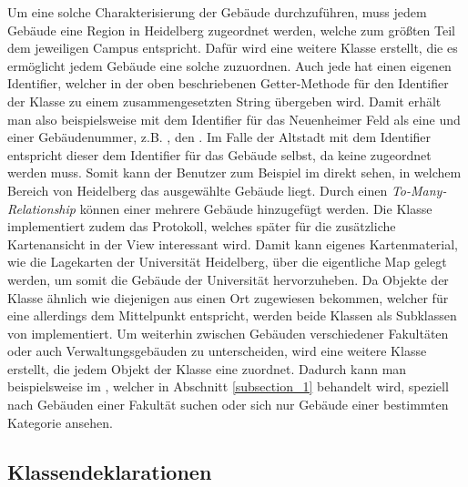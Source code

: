 \documentclass{report}
\begin{document}
\noindent Um eine solche Charakterisierung der Gebäude durchzuführen, muss jedem Gebäude eine Region in Heidelberg zugeordnet werden, welche zum größten Teil dem jeweiligen Campus entspricht. Dafür wird eine weitere Klasse  erstellt, die es ermöglicht jedem Gebäude eine solche  zuzuordnen. Auch jede  hat einen eigenen Identifier, welcher in der oben beschriebenen Getter-Methode für den Identifier der  Klasse zu einem zusammengesetzten String übergeben wird. Damit erhält man also beispielsweise mit dem Identifier  für das Neuenheimer Feld als eine  und einer Gebäudenummer, z.B. , den  . Im Falle der Altstadt mit dem Identifier  entspricht dieser dem Identifier für das Gebäude selbst, da keine  zugeordnet werden muss. Somit kann der Benutzer zum Beispiel im  direkt sehen, in welchem Bereich von Heidelberg das ausgewählte Gebäude liegt. Durch einen \emph{To-Many-Relationship}  können einer  mehrere Gebäude hinzugefügt werden. Die Klasse  implementiert zudem das  Protokoll, welches später für die zusätzliche Kartenansicht in der View interessant wird. Damit kann eigenes Kartenmaterial, wie die Lagekarten der Universität Heidelberg, über die eigentliche Map gelegt werden, um somit die Gebäude der Universität hervorzuheben. Da Objekte der Klasse  ähnlich wie diejenigen aus  einen Ort zugewiesen bekommen, welcher für eine  allerdings dem Mittelpunkt entspricht, werden beide Klassen als Subklassen von  implementiert. Um weiterhin zwischen Gebäuden verschiedener Fakultäten oder auch Verwaltungsgebäuden zu unterscheiden, wird eine weitere Klasse  erstellt, die jedem Objekt der Klasse  eine  zuordnet. Dadurch kann man beispielsweise im , welcher in Abschnitt \ref{subsection_1} behandelt wird, speziell nach Gebäuden einer Fakultät suchen oder sich nur Gebäude einer bestimmten Kategorie ansehen. 

\newpage

\subsection{Klassendeklarationen}
\end{document}
